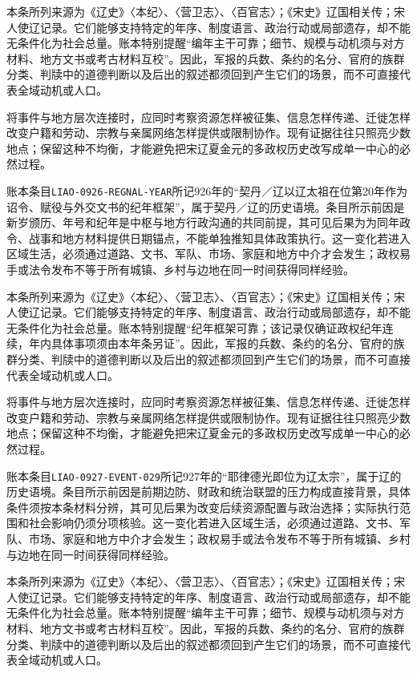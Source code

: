 本条所列来源为《辽史》〈本纪〉、〈营卫志〉、〈百官志〉；《宋史》辽国相关传；宋人使辽记录。它们能够支持特定的年序、制度语言、政治行动或局部遗存，却不能无条件化为社会总量。账本特别提醒“编年主干可靠；细节、规模与动机须与对方材料、地方文书或考古材料互校”。因此，军报的兵数、条约的名分、官府的族群分类、判牍中的道德判断以及后出的叙述都须回到产生它们的场景，而不可直接代表全域动机或人口。

将事件与地方层次连接时，应同时考察资源怎样被征集、信息怎样传递、迁徙怎样改变户籍和劳动、宗教与亲属网络怎样提供或限制协作。现有证据往往只照亮少数地点；保留这种不均衡，才能避免把宋辽夏金元的多政权历史改写成单一中心的必然过程。

账本条目\texttt{LIAO-0926-REGNAL-YEAR}所记926年的“契丹／辽以辽太祖在位第20年作为诏令、赋役与外交文书的纪年框架”，属于契丹／辽的历史语境。条目所示前因是新岁颁历、年号和纪年是中枢与地方行政沟通的共同前提，其可见后果为为同年政令、战事和地方材料提供日期锚点，不能单独推知具体政策执行。这一变化若进入区域生活，必须通过道路、文书、军队、市场、家庭和地方中介才会发生；政权易手或法令发布不等于所有城镇、乡村与边地在同一时间获得同样经验。

本条所列来源为《辽史》〈本纪〉、〈营卫志〉、〈百官志〉；《宋史》辽国相关传；宋人使辽记录。它们能够支持特定的年序、制度语言、政治行动或局部遗存，却不能无条件化为社会总量。账本特别提醒“纪年框架可靠；该记录仅确证政权纪年连续，年内具体事项须由本年条另证”。因此，军报的兵数、条约的名分、官府的族群分类、判牍中的道德判断以及后出的叙述都须回到产生它们的场景，而不可直接代表全域动机或人口。

将事件与地方层次连接时，应同时考察资源怎样被征集、信息怎样传递、迁徙怎样改变户籍和劳动、宗教与亲属网络怎样提供或限制协作。现有证据往往只照亮少数地点；保留这种不均衡，才能避免把宋辽夏金元的多政权历史改写成单一中心的必然过程。

账本条目\texttt{LIAO-0927-EVENT-029}所记927年的“耶律德光即位为辽太宗”，属于辽的历史语境。条目所示前因是前期边防、财政和统治联盟的压力构成直接背景，具体条件须按本条材料分辨，其可见后果为改变后续资源配置与政治选择；实际执行范围和社会影响仍须分项核验。这一变化若进入区域生活，必须通过道路、文书、军队、市场、家庭和地方中介才会发生；政权易手或法令发布不等于所有城镇、乡村与边地在同一时间获得同样经验。

本条所列来源为《辽史》〈本纪〉、〈营卫志〉、〈百官志〉；《宋史》辽国相关传；宋人使辽记录。它们能够支持特定的年序、制度语言、政治行动或局部遗存，却不能无条件化为社会总量。账本特别提醒“编年主干可靠；细节、规模与动机须与对方材料、地方文书或考古材料互校”。因此，军报的兵数、条约的名分、官府的族群分类、判牍中的道德判断以及后出的叙述都须回到产生它们的场景，而不可直接代表全域动机或人口。

